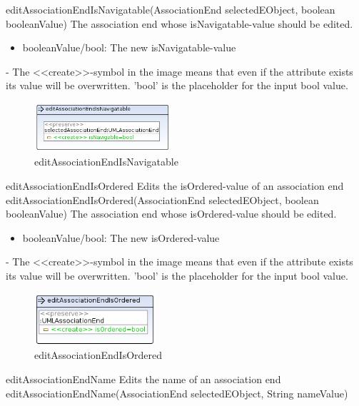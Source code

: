 {editAssociationEndIsNavigatable(AssociationEnd selectedEObject, boolean
booleanValue)}
{The association end whose isNavigatable-value should be edited.}
{
\begin{itemize}
 \item booleanValue/bool: The new isNavigatable-value
\end{itemize}
}
{-}
{The \textless\textless create\textgreater\textgreater  -symbol in the image
means that even if the attribute exists its value will be overwritten.
'bool' is the placeholder for the input bool value.}
\begin{figure}[H]
  \centering
  \includegraphics[width=0.45\textwidth]{pics/editAssociationEndIsNavigatable.png}
  \caption{editAssociationEndIsNavigatable}
  \label{editAssociationEndIsNavigatable}
\end{figure}
\op
{editAssociationEndIsOrdered}
{Edits the isOrdered-value of an association end}
{editAssociationEndIsOrdered(AssociationEnd selectedEObject, boolean
booleanValue)}
{The association end whose isOrdered-value should be edited.}
{
\begin{itemize}
 \item booleanValue/bool: The new isOrdered-value
\end{itemize}
}
{-}
{The \textless\textless create\textgreater\textgreater  -symbol in the image
means that even if the attribute exists its value will be overwritten.
'bool' is the placeholder for the input bool value.}
\begin{figure}[H]
  \centering
  \includegraphics[width=0.4\textwidth]{pics/editAssociationEndIsOrdered.png}
  \caption{editAssociationEndIsOrdered}
  \label{editAssociationEndIsOrdered}
\end{figure}
\op
{editAssociationEndName}
{Edits the name of an association end}
{editAssociationEndName(AssociationEnd selectedEObject, String nameValue)}
